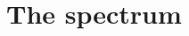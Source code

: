 \documentclass[11pt,a4paper]{book}
\theoremstyle{plain}
\numberwithin{equation}{section}
\renewcommand{\Re}{\operatorname{Re}}
\renewcommand{\Im}{\operatorname{Im}}
\newcounter{test}
\begin{document}


\section{The spectrum}\label{sec:spectrum}
\end{document}
